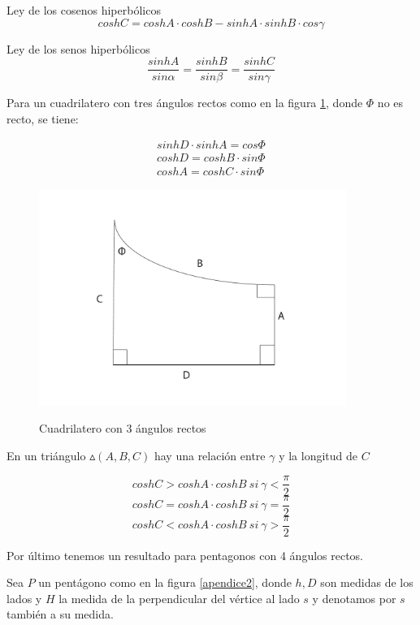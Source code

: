  Ley de los cosenos hiperb\'olicos
 \begin{equation}
 coshC=coshA \cdot coshB - sinhA\cdot sinhB\cdot cos \gamma
 \end{equation}

Ley de los senos hiperb\'olicos
\begin{equation}
\frac{sinhA}{sin \alpha} =\frac{sinhB}{sin \beta}= \frac{sinhC}{sin \gamma}
\end{equation}

Para un cuadrilatero con tres \'angulos rectos como en la figura \ref{apendice1}, donde $\Phi$ no es recto, se tiene:

\begin{eqnarray}
sinhD\cdot sinhA =cos \Phi \\
cosh D = cosh B \cdot sin \Phi \\
coshA=coshC\cdot sin \Phi
\end{eqnarray}

\begin{figure}[h]
  \centering
  \includegraphics[width=10cm]{apendice1}\\
  \caption{Cuadrilatero con 3 \'angulos rectos}\label{apendice1}
\end{figure}

En un tri\'angulo $\vartriangle (A,B,C)$ hay una relaci\'on entre $\gamma$ y la longitud de $C$

$$coshC > coshA\cdot coshB \ si \ \gamma < \frac{\pi}{2}$$
$$ coshC = coshA \cdot coshB \ si  \ \gamma= \frac{\pi}{2}$$
$$ coshC < coshA \cdot coshB \ si \ \gamma > \frac{\pi}{2}$$

Por \'ultimo tenemos un resultado para pentagonos con 4 \'angulos rectos.

Sea $P$ un pent\'agono como en la figura \ref{apendice2}, donde $h,D$ son medidas de los lados  y $H$ la medida de la perpendicular del v\'ertice al lado $s$ y denotamos por $s$ tambi\'en a su medida.

